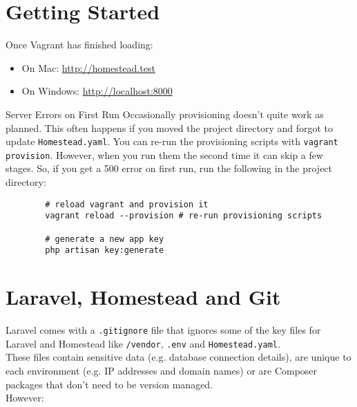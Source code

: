 \section{Getting Started}

Once Vagrant has finished loading:

\begin{itemize}
    \item On Mac: \href{http://homestead.test}{http://homestead.test}
    \item On Windows: \href{http://localhost:8000}{http://localhost:8000}
\end{itemize}



\begin{infobox}{Server Errors on First Run}
    Occasionally provisioning doesn't quite work as planned. This often happens if you moved the project directory and forgot to update \texttt{Homestead.yaml}. You can re-run the provisioning scripts with \texttt{vagrant provision}. However, when you run them the second time it can skip a few stages. So, if you get a 500 error on first run, run the following in the project directory:

    \begin{verbatim}
        # reload vagrant and provision it
        vagrant reload --provision # re-run provisioning scripts

        # generate a new app key
        php artisan key:generate
    \end{verbatim}
\end{infobox}

\section{Laravel, Homestead and Git}

Laravel comes with a \texttt{.gitignore} file that ignores some of the key files for Laravel and Homestead like \texttt{/vendor}, \texttt{.env} and \texttt{Homestead.yaml}.
\\

These files contain sensitive data (e.g. database connection details), are unique to each environment (e.g. IP addresses and domain names) or are Composer packages that don't need to be version managed.
\\

However:

